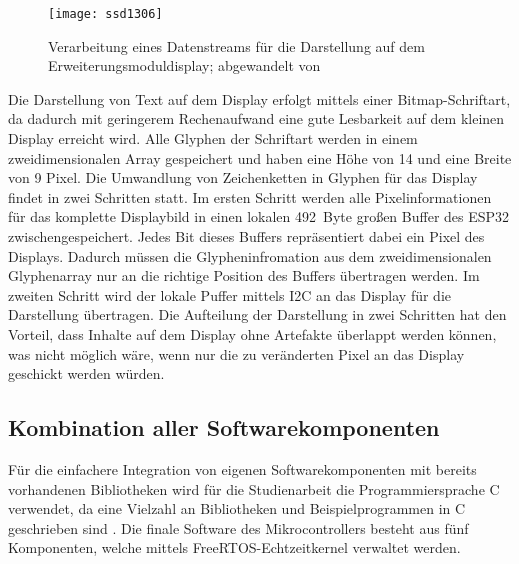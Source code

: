\begin{figure}[h]
    \centering
    \texttt{[image: ssd1306]}
    \caption{Verarbeitung eines Datenstreams für die Darstellung auf dem Erweiterungsmoduldisplay; abgewandelt von \cite[S.~37]{ssd1306}}
    \label{fig:ssd1306PixelControl}
\end{figure}

Die Darstellung von Text auf dem Display erfolgt mittels einer Bitmap-Schriftart, da dadurch mit geringerem Rechenaufwand eine gute Lesbarkeit auf dem kleinen Display erreicht wird. Alle Glyphen der Schriftart werden in einem zweidimensionalen Array gespeichert und haben eine Höhe von 14 und eine Breite von 9 Pixel. Die Umwandlung von Zeichenketten in Glyphen für das Display findet in zwei Schritten statt. Im ersten Schritt werden alle Pixelinformationen für das komplette Displaybild in einen lokalen 492~Byte großen Buffer des ESP32 zwischengespeichert. Jedes Bit dieses Buffers repräsentiert dabei ein Pixel des Displays. Dadurch müssen die Glypheninfromation aus dem zweidimensionalen Glyphenarray nur an die richtige Position des Buffers übertragen werden. Im zweiten Schritt wird der lokale Puffer mittels \ac{I2C} an das Display für die Darstellung übertragen. Die Aufteilung der Darstellung in zwei Schritten hat den Vorteil, dass Inhalte auf dem Display ohne Artefakte überlappt werden können, was nicht möglich wäre, wenn nur die zu veränderten Pixel an das Display geschickt werden würden.

\subsection{Kombination aller Softwarekomponenten}
\label{section:softwareCombination}
Für die einfachere Integration von eigenen Softwarekomponenten mit bereits vorhandenen Bibliotheken wird für die Studienarbeit die Programmiersprache C verwendet, da eine Vielzahl an Bibliotheken und Beispielprogrammen in C geschrieben sind \cite{espressifIDF}. Die finale Software des Mikrocontrollers besteht aus fünf Komponenten, welche mittels FreeRTOS-Echtzeitkernel verwaltet werden. 

